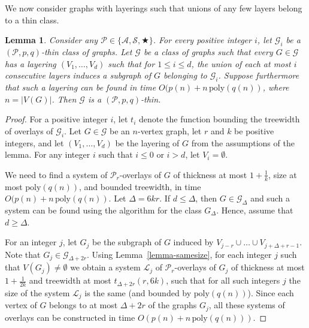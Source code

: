 \documentclass[a4paper,11pt]{article}
\newcommand{\Aa}{{\mathcal A}}
\newcommand{\GG}{{\mathcal G}}
\newcommand{\LL}{{\mathcal L}}
\newcommand{\Ss}{{\mathcal S}}
\newcommand{\PP}{{\mathcal P}}
\newcommand{\poly}{\text{poly}}
\newtheorem{lemma}[theorem]{Lemma}
\begin{document}
We now consider graphs with layerings such that unions of any few layers belong to a thin class.
\begin{lemma}\label{lemma-layering}
Consider any $\PP\in\{\Aa,\Ss,\bigstar\}$.
For every positive integer $i$, let $\GG_i$ be a $(\PP,p,q)$-thin class of graphs.
Let $\GG$ be a class of graphs such that every $G\in\GG$ has a layering $(V_1,\ldots, V_d)$ such that
for $1\le i\le d$, the union of each at most $i$ consecutive layers induces a subgraph of $G$ belonging to $\GG_i$.
Suppose furthermore that such a layering can be found in time $O(p(n)+n\,\poly(q(n))$, where $n=|V(G)|$.
Then $\GG$ is a $(\PP,p,q)$-thin.
\end{lemma}
\begin{proof}
For a positive integer $i$, let $t_i$ denote the function bounding the treewidth of overlays of $\GG_i$.
Let $G\in\GG$ be an $n$-vertex graph, let $r$ and $k$ be positive integers, and let $(V_1,\ldots,V_d)$ be
the layering of $G$ from the assumptions of the lemma. For any integer $i$ such that $i\le 0$ or $i>d$, let $V_i=\emptyset$.

We need to find a system of $\PP_r$-overlays of $G$
of thickness at most $1+\frac{1}{k}$, size at most $\poly(q(n))$, and bounded treewidth, in time $O(p(n)+n\,\poly(q(n))$.
Let $\Delta=6kr$.  If $d\le\Delta$, then $G\in\GG_\Delta$ and such a system can be found using the algorithm
for the class $G_\Delta$. Hence, assume that $d\ge\Delta$.

For an integer $j$, let $G_j$ be the subgraph of $G$ induced by
$V_{j-r}\cup \ldots\cup V_{j+\Delta+r-1}$.  Note that $G_j\in \GG_{\Delta+2r}$.  Using Lemma~\ref{lemma-samesize},
for each integer $j$ such that $V(G_j)\neq\emptyset$ we obtain a system $\LL_j$ of $\PP_r$-overlays of $G_j$ of thickness at most $1+\frac{1}{2k}$ and
treewidth at most $t_{\Delta+2r}(r,6k)$, such that for all such integers $j$ the size of the system $\LL_j$ is the same (and bounded by $\poly(q(n))$).
Since each vertex of $G$ belongs to at most $\Delta+2r$ of the graphs $G_j$, all these systems of overlays
can be constructed in time $O(p(n)+n\,\poly(q(n)))$.


\end{proof}
\end{document}
